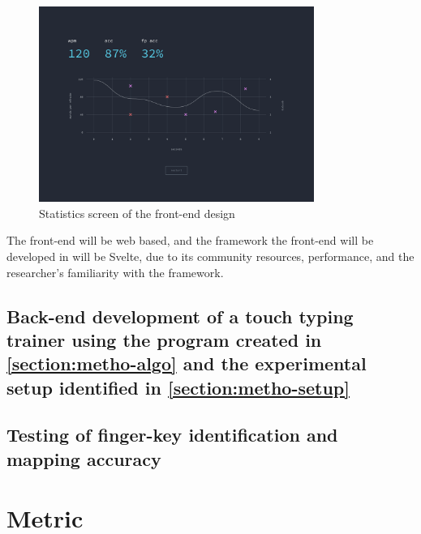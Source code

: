 \documentclass{report}
\begin{document}
\begin{figure}[H]
	\centering
	\includegraphics[width=0.8\textwidth]{ui-stats.png}
	\caption{Statistics screen of the front-end design}
	\label{fig:ui-stat}
	\centering
\end{figure}

The front-end will be web based, and the framework the front-end will be
developed in will be Svelte, due to its community resources, performance, and
the researcher's familiarity with the framework.



\subsection{Back-end development of a touch typing trainer using the program created
	in \ref{section:metho-algo} and the experimental setup identified in
	\ref{section:metho-setup}}
\subsection{Testing of finger-key identification and mapping accuracy}
\section{Metric}

\newpage
\printbibliography[heading=bibintoc,title={References}]{}
\end{document}
